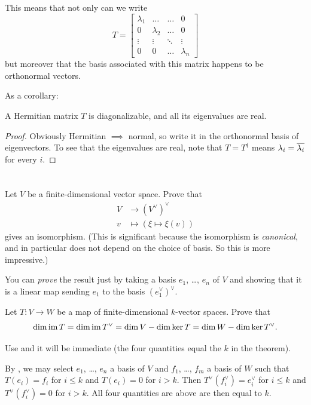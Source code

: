 This means that not only can we write
\[ T = \begin{bmatrix}
		\lambda_1 & \dots & \dots & 0 \\
		0 & \lambda_2 & \dots & 0 \\
		\vdots & \vdots & \ddots & \vdots \\
		0 & 0 & \dots & \lambda_n
	\end{bmatrix}
\]
but moreover that the basis associated with this matrix happens to be orthonormal vectors.

As a corollary:
\begin{theorem}
	A Hermitian matrix $T$ is diagonalizable,
	and all its eigenvalues are real.
\end{theorem}
\begin{proof}
	Obviously Hermitian $\implies$ normal,
	so write it in the orthonormal basis of eigenvectors.
	To see that the eigenvalues are real, note that $T = T^\dagger$
	means $\lambda_i = \overline{\lambda_i}$ for every $i$.
\end{proof}

\section{\problemhead}
\begin{sproblem}
	\onechili
	\label{prob:double_dual}
	Let $V$ be a finite-dimensional vector space.
	Prove that
	\begin{align*}
		V &\to (V^\vee)^\vee \\
		v &\mapsto \left( \xi \mapsto \xi(v) \right)
	\end{align*}
	gives an isomorphism.
	(This is significant because the isomorphism is \emph{canonical},
	and in particular does not depend on the choice of basis.
	So this is more impressive.)
	\begin{hint}
		You can \emph{prove} the result just by taking a basis
		$e_1$, \dots, $e_n$ of $V$
		and showing that it is a linear map sending $e_1$
		to the basis $(e_1^\vee)^\vee$.
	\end{hint}
\end{sproblem}

\begin{problem}
	\label{prob:fundamental_theorem_of_linalg}
	Let $T \colon V \to W$ be a map of finite-dimensional $k$-vector spaces.
	Prove that
	\[ \dim \operatorname{im} T = \dim \operatorname{im} T^\vee
		= \dim V - \dim \ker T = \dim W - \dim \ker T^\vee. \]
	\begin{hint}
		Use  and it will be immediate
		(the four quantities equal the $k$ in the theorem).
	\end{hint}
	\begin{sol}
		By ,
		we may select $e_1$, \dots, $e_n$ a basis of $V$
		and $f_1$, \dots, $f_m$ a basis of $W$
		such that $T(e_i) = f_i$ for $i \le k$
		and $T(e_i) = 0$ for $i > k$.
		Then $T^\vee(f_i^\vee) = e_i^\vee$ for $i \le k$
		and $T^\vee(f_i^\vee) = 0$ for $i > k$.
		All four quantities are above are then equal to $k$.
	\end{sol}
\end{problem}

